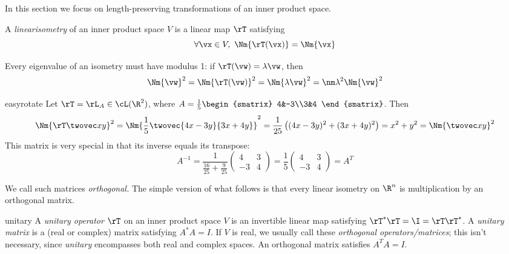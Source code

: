 In this section we focus on length-preserving transformations of an inner product space.

\begin{defn}{}{}
A \emph{linear\footnotemark isometry} of an inner product space $V$ is a linear map $\rT$ satisfying
\[\forall \vx\in V,\ \Nm{\rT(\vx)}=\Nm{\vx}\]
\end{defn}


Every eigenvalue of an isometry must have modulus 1: if $\rT(\vw)=\lambda\vw$, then
\[\Nm{\vw}^2=\Nm{\rT(\vw)}^2=\Nm{\lambda\vw}^2=\nm\lambda^2\Nm{\vw}^2\]

\begin{example}{}{easyrotate}
Let $\rT=\rL_A\in\cL(\R^2)$, where $A=\frac 15\begin{smatrix}
4&-3\\3&4
\end{smatrix}$. Then
\[\Nm{\rT\twovec xy}^2=\Nm{\frac 15\twovec{4x-3y}{3x+4y}}^2=\frac 1{25}\left((4x-3y)^2+(3x+4y)^2\right)=x^2+y^2=\Nm{\twovec xy}^2\]
This matrix is very special in that its inverse equals its transpose:
\[A^{-1}=\frac 1{\frac{16}{25}+\frac 9{25}}\begin{pmatrix}
4&3\\-3&4
\end{pmatrix} =\frac 1{5}\begin{pmatrix}
4&3\\-3&4
\end{pmatrix}=A^T\]
\end{example}

We call such matrices \emph{orthogonal.} The simple version of what follows is that every linear isometry on $\R^n$ is multiplication by an orthogonal matrix.

\begin{defn}{}{unitary}
A \emph{unitary operator} $\rT$ on an inner product space $V$ is an invertible linear map satisfying $\rT^*\rT=\I=\rT\rT^*$. A \emph{unitary matrix} is a (real or complex) matrix satisfying $A^*A=I$.\smallbreak
If $V$ is real, we usually call these \emph{orthogonal operators/matrices}; this isn't necessary, since \emph{unitary} encompasses both real and complex spaces. An orthogonal matrix satisfies $A^TA=I$.
\end{defn}

